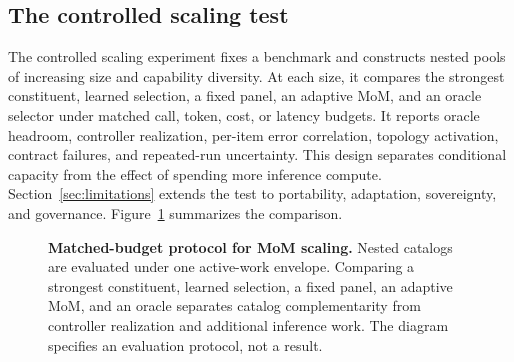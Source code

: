 \FloatBarrier
\subsection{The controlled scaling test}
\label{sec:required-experiments}

The controlled scaling experiment fixes a benchmark and constructs nested pools
of increasing size and capability diversity. At each size, it compares the
strongest constituent, learned selection, a fixed panel, an adaptive MoM, and an
oracle selector under matched call, token, cost, or latency budgets. It reports
oracle headroom, controller realization, per-item error correlation, topology
activation, contract failures, and repeated-run uncertainty. This design
separates conditional capacity from the effect of spending more inference
compute. Section~\ref{sec:limitations} extends the test to portability,
adaptation, sovereignty, and governance. Figure~\ref{fig:matched-budget-protocol}
summarizes the comparison.

\begin{figure}[H]
  \centering
  \resizebox{\linewidth}{!}{}
  \caption{\textbf{Matched-budget protocol for MoM scaling.} Nested catalogs
  are evaluated under one active-work envelope. Comparing a strongest
  constituent, learned selection, a fixed panel, an adaptive MoM, and an oracle
  separates catalog complementarity from controller realization and additional
  inference work. The diagram specifies an evaluation protocol, not a result.}
  \label{fig:matched-budget-protocol}
\end{figure}

\FloatBarrier
